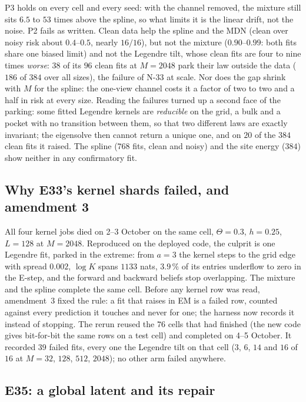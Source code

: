 \documentclass[10pt,a4paper]{article}
\newcommand{\Th}{\Theta}
\theoremstyle{plain}
\theoremstyle{remark}
\begin{document}
P3 holds on every cell and every seed: with the channel removed, the mixture still sits $6.5$ to $53$
times above the spline, so what limits it is the linear drift, not the noise. P2 fails as written. Clean data
help the spline and the MDN (clean over noisy risk about $0.4$--$0.5$, nearly $16/16$), but not the mixture
($0.90$--$0.99$: both fits share one biased limit) and not the Legendre tilt, whose clean fits are four to nine
times \emph{worse}: $38$ of its $96$ clean fits at $M=2048$ park their law outside the data ($186$ of $384$
over all sizes), the failure of N-33 at scale. Nor does the gap shrink with $M$ for the spline: the one-view
channel costs it a factor of two to two and a half in risk at every size. Reading the failures turned up a second
face of the parking: some fitted Legendre kernels are \emph{reducible} on the grid, a bulk and a pocket with no
transition between them, so that two different laws are exactly invariant; the eigensolve then cannot return a
unique one, and on $20$ of the $384$ clean fits it raised. The spline ($768$ fits, clean and noisy) and the site
energy ($384$) show neither in any confirmatory fit.

\subsection{Why E33's kernel shards failed, and amendment 3}

All four kernel jobs died on 2--3 October on the same cell, $\Th=0.3$, $h=0.25$, $L=128$ at $M=2048$.
Reproduced on the deployed code, the culprit is one Legendre fit, parked in the extreme: from $a=3$ the
kernel steps to the grid edge with spread $0.002$, $\log K$ spans $1133$ nats, $3.9\,\%$ of its entries
underflow to zero in the E-step, and the forward and backward beliefs stop overlapping. The mixture and
the spline complete the same cell. Before any kernel row was read, amendment~3 fixed the rule: a fit that
raises in EM is a failed row, counted against every prediction it touches and never for one; the harness
now records it instead of stopping. The rerun reused the $76$ cells that had finished (the new code gives
bit-for-bit the same rows on a test cell) and completed on 4--5 October. It recorded $39$ failed fits, every one
the Legendre tilt on that cell ($3$, $6$, $14$ and $16$ of $16$ at $M=32$, $128$, $512$, $2048$); no other arm
failed anywhere.

\subsection{E35: a global latent and its repair}
\end{document}
